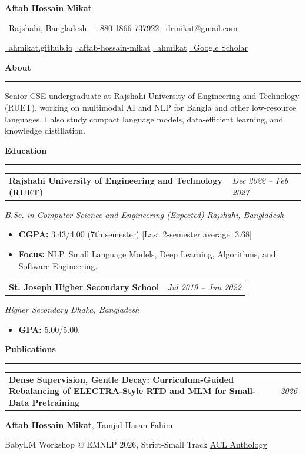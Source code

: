 \documentclass[11pt,a4paper]{article}
\makeatletter
\newcommand{\cvsection}[1]{%
  \needspace{3\baselineskip}%
  \vspace{4pt}%
  {\Large\bfseries #1}\par
  \vspace{2pt}\hrule\vspace{4pt}%
}
\newcommand{\entryheading}[2]{%
  \begin{tabularx}{\textwidth}{@{}>{\raggedright\arraybackslash}X>{\raggedleft\arraybackslash}p{1.55in}@{}}
    \textbf{#1} & \textit{#2}
  \end{tabularx}\vspace{1pt}%
}
\newcommand{\subline}[1]{{\itshape #1}\par}
\newcommand{\spacer}{\vspace{6pt}}
\makeatother
\begin{document}
\begin{center}
  {\fontsize{26}{30}\selectfont\bfseries Aftab Hossain Mikat}\par
  \vspace{3pt}
  \small
  \faMapMarker*\ Rajshahi, Bangladesh
  \quad
  \href{tel:+8801866737922}{\faPhone*\ +880 1866-737922}
  \quad
  \href{mailto:drmikat@gmail.com}{\faEnvelope\ drmikat@gmail.com}
  \par\vspace{2pt}
  \href{https://ahmikat.github.io/}{\faGlobe\ ahmikat.github.io}
  \quad
  \href{https://www.linkedin.com/in/aftab-hossain-mikat}{\faLinkedin\ aftab-hossain-mikat}
  \quad
  \href{https://github.com/ahmikat}{\faGithub\ ahmikat}
  \quad
  \href{https://scholar.google.com/citations?user=0rwD_88AAAAJ}{\faGraduationCap\ Google Scholar}
\end{center}

\cvsection{About}
Senior CSE undergraduate at Rajshahi University of Engineering and Technology (RUET), working on
multimodal AI and NLP for Bangla and other low-resource languages. I also study compact language
models, data-efficient learning, and knowledge distillation.

\cvsection{Education}
\entryheading{Rajshahi University of Engineering and Technology (RUET)}{Dec 2022 -- Feb 2027}
\subline{B.Sc. in Computer Science and Engineering (Expected) \hfill Rajshahi, Bangladesh}
\begin{itemize}
  \item \textbf{CGPA:} 3.43/4.00 (7th semester) [Last 2-semester average: 3.68]
  \item \textbf{Focus:} NLP, Small Language Models, Deep Learning,
        Algorithms, and Software Engineering.
\end{itemize}
\spacer

\entryheading{St. Joseph Higher Secondary School}{Jul 2019 -- Jun 2022}
\subline{Higher Secondary \hfill Dhaka, Bangladesh}
\begin{itemize}
  \item \textbf{GPA:} 5.00/5.00.
\end{itemize}

\cvsection{Publications}
\begingroup\linespread{1.20}\selectfont
\entryheading{Dense Supervision, Gentle Decay: Curriculum-Guided Rebalancing of
ELECTRA-Style RTD and MLM for Small-Data Pretraining}{2026}
\textbf{Aftab Hossain Mikat}, Tamjid Hasan Fahim\par
{\small BabyLM Workshop @ EMNLP 2026, Strict-Small Track \hfill \href{https://aclanthology.org/2026.babylm-main.66/}{ACL Anthology \faExternalLink*}\par}
\vspace{8pt}
\end{document}
